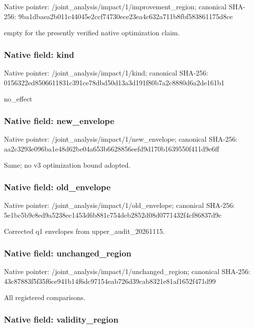 \documentclass[10pt,a4paper]{article}
\begin{document}
Native pointer: /joint\_analysis/impact/1\allowbreak{}/improvement\_region; canonical SHA-256: 9ba1dbaea2b011c44045e2cc\allowbreak{}f74730ece23ea4c632a711b8\allowbreak{}fbf583861175d8ce


empty for the presently verified native optimization claim.


\subsubsection{Native field: kind}


Native pointer: /joint\_analysis/impact/1/kind; canonical SHA-256: 0156322ed8506611831c391c\allowbreak{}e78dbd50d13a3d191f80b7a2\allowbreak{}c8880d6a2de161b1


no\_effect


\subsubsection{Native field: new\_envelope}


Native pointer: /joint\_analysis/impact/1/new\_envelope; canonical SHA-256: aa2c3293e096ba1e48d62be0\allowbreak{}4a653b6628856eefd9d170b1\allowbreak{}639550f411d9e6ff


Same; no v3 optimization bound adopted.


\subsubsection{Native field: old\_envelope}


Native pointer: /joint\_analysis/impact/1/old\_envelope; canonical SHA-256: 5e1bc5b9c8ed9a5238ec1453\allowbreak{}d6b881c754deb2852d08d077\allowbreak{}1432f4cf86837d9c


Corrected q1 envelopes from upper\_audit\_20261115.


\subsubsection{Native field: unchanged\_region}


Native pointer: /joint\_analysis/impact/1\allowbreak{}/unchanged\_region; canonical SHA-256: 43c87883f5f35f6ce941b14f\allowbreak{}6dc97154eab726d39cab8321\allowbreak{}e81af1652f471d99


All registered comparisons.


\subsubsection{Native field: validity\_region}
\end{document}
